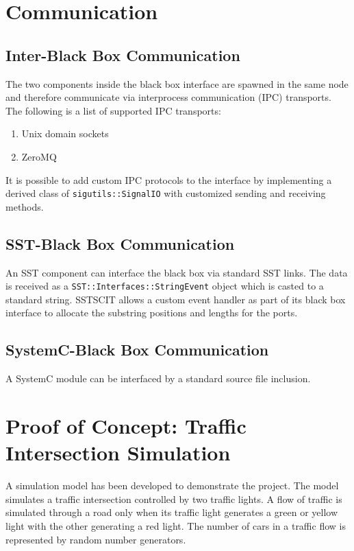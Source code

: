 \documentclass{article}
\begin{document}
  \section{Communication}

    \subsection{Inter-Black Box Communication}
    The two components inside the black box interface are spawned in the same node and therefore
    communicate via interprocess communication (IPC) transports. The following is a list of
    supported IPC transports:
    \begin{enumerate}
      \item Unix domain sockets
      \item ZeroMQ
    \end{enumerate}

    It is possible to add custom IPC protocols to the interface by implementing a derived class of
    \lstinline{sigutils::SignalIO} with customized sending and receiving methods.

    \subsection{SST-Black Box Communication}
    An SST component can interface the black box via standard SST links. The data is received as a
    \lstinline{SST::Interfaces::StringEvent} object which is casted to a standard string. SSTSCIT
    allows a custom event handler as part of its black box interface to allocate the substring
    positions and lengths for the ports.

    \subsection{SystemC-Black Box Communication}
    A SystemC module can be interfaced by a standard source file inclusion.

  \section{Proof of Concept: Traffic Intersection Simulation}
  A simulation model has been developed to demonstrate the project. The model simulates a traffic
  intersection controlled by two traffic lights. A flow of traffic is simulated through a road only
  when its traffic light generates a green or yellow light with the other generating a red light.
  The number of cars in a traffic flow is represented by random number generators.
\end{document}
